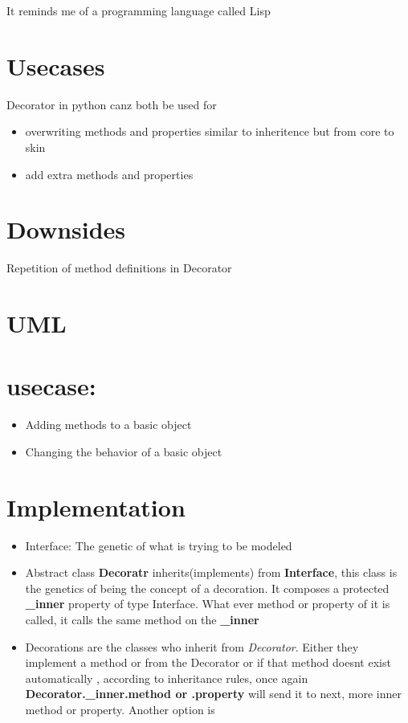 \documentclass[a4paper]{article}
\title{}
\date{}
\begin{document}
    \maketitle
    It reminds me of a programming language called Lisp \textbf{}
    
    
    \section{Usecases}
        Decorator in python canz both be used for
        \begin{itemize}
            \item overwriting methods and properties similar to inheritence but from core to skin
            \item add extra methods and properties
        \end{itemize}
    
    
    \section{Downsides}
        Repetition of method definitions in Decorator
        
    \section{UML}
    
    \section{usecase:}
        \begin{itemize}
            \item Adding methods to a basic object
            \item Changing the behavior of a basic object
        \end{itemize}
    
    \section{Implementation}
        \begin{itemize}
            \item Interface: The genetic of what is trying to be modeled
            \item Abstract class \textbf{Decoratr} inherits(implements) from \textbf{Interface}, this class is the genetics of being the concept of a decoration. It composes a protected \textbf{\_inner} property of type Interface. What ever method or property of it is called, it calls the same method on the \textbf{\_inner}
            \item Decorations are the classes who inherit from \textit{Decorator}. Either they implement a method or from the Decorator or if that method doesnt exist automatically , according to inheritance rules, once again \textbf{Decorator.\_inner.method or .property} will send it to next, more inner method or property. Another option is
        \end{itemize}
    
\end{document}
